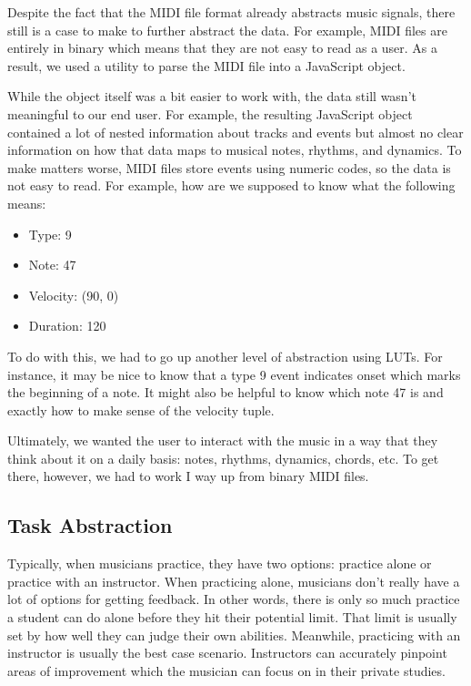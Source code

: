 \documentclass[journal]{vgtc}                %
\begin{document}
Despite the fact that the MIDI file format already abstracts music signals,
there still is a case to make to further abstract the data. For example,
MIDI files are entirely in binary which means that they are not easy to read
as a user. As a result, we used a utility to parse the MIDI file into a
JavaScript object.

While the object itself was a bit easier to work with, the data still wasn't
meaningful to our end user. For example, the resulting JavaScript object
contained a lot of nested information about tracks and events but almost no
clear information on how that data maps to musical notes, rhythms, and dynamics.
To make matters worse, MIDI files store events using numeric codes, so the
data is not easy to read. For example, how are we supposed to know what
the following means:

\begin{itemize}
  \item Type: 9
  \item Note: 47
  \item Velocity: (90, 0)
  \item Duration: 120
\end{itemize}

To do with this, we had to go up another level of abstraction using LUTs.
For instance, it may be nice to know that a type 9 event indicates onset which
marks the beginning of a note. It might also be helpful to know which note 47
is and exactly how to make sense of the velocity tuple.

Ultimately, we wanted the user to interact with the music in a way that they
think about it on a daily basis: notes, rhythms, dynamics, chords, etc. To get
there, however, we had to work I way up from binary MIDI files.

\subsection{Task Abstraction}

Typically, when musicians practice, they have two options: practice alone or
practice with an instructor. When practicing alone, musicians don't really have
a lot of options for getting feedback. In other words, there is only so much
practice a student can do alone before they hit their potential limit. That
limit is usually set by how well they can judge their own abilities. Meanwhile,
practicing with an instructor is usually the best case scenario. Instructors can
accurately pinpoint areas of improvement which the musician can focus on in their
private studies.
\end{document}
